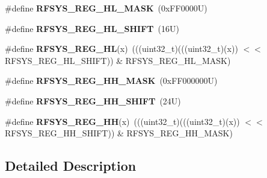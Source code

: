 \begin{DoxyCompactItemize}
\#define {\bfseries R\+F\+S\+Y\+S\+\_\+\+R\+E\+G\+\_\+\+H\+L\+\_\+\+M\+A\+SK}~(0x\+F\+F0000\+U)
\item 
\mbox{\label{group___r_f_s_y_s___register___masks_gabc34a2d1963a697d1a773a8981a063f5}} 
\#define {\bfseries R\+F\+S\+Y\+S\+\_\+\+R\+E\+G\+\_\+\+H\+L\+\_\+\+S\+H\+I\+FT}~(16\+U)
\item 
\mbox{\label{group___r_f_s_y_s___register___masks_gaea8beedf47675b6b2c630526a03d90e5}} 
\#define {\bfseries R\+F\+S\+Y\+S\+\_\+\+R\+E\+G\+\_\+\+HL}(x)~(((uint32\+\_\+t)(((uint32\+\_\+t)(x)) $<$$<$ R\+F\+S\+Y\+S\+\_\+\+R\+E\+G\+\_\+\+H\+L\+\_\+\+S\+H\+I\+FT)) \& R\+F\+S\+Y\+S\+\_\+\+R\+E\+G\+\_\+\+H\+L\+\_\+\+M\+A\+SK)
\item 
\mbox{\label{group___r_f_s_y_s___register___masks_gae1fb55483b3d79a2e74d0c1ad4e57d51}} 
\#define {\bfseries R\+F\+S\+Y\+S\+\_\+\+R\+E\+G\+\_\+\+H\+H\+\_\+\+M\+A\+SK}~(0x\+F\+F000000\+U)
\item 
\mbox{\label{group___r_f_s_y_s___register___masks_gae78b067bd28db1d0ff57015f300312fb}} 
\#define {\bfseries R\+F\+S\+Y\+S\+\_\+\+R\+E\+G\+\_\+\+H\+H\+\_\+\+S\+H\+I\+FT}~(24\+U)
\item 
\mbox{\label{group___r_f_s_y_s___register___masks_ga9724177c60594bb3a22f13e9ef7de07c}} 
\#define {\bfseries R\+F\+S\+Y\+S\+\_\+\+R\+E\+G\+\_\+\+HH}(x)~(((uint32\+\_\+t)(((uint32\+\_\+t)(x)) $<$$<$ R\+F\+S\+Y\+S\+\_\+\+R\+E\+G\+\_\+\+H\+H\+\_\+\+S\+H\+I\+FT)) \& R\+F\+S\+Y\+S\+\_\+\+R\+E\+G\+\_\+\+H\+H\+\_\+\+M\+A\+SK)
\end{DoxyCompactItemize}


\subsection{Detailed Description}
